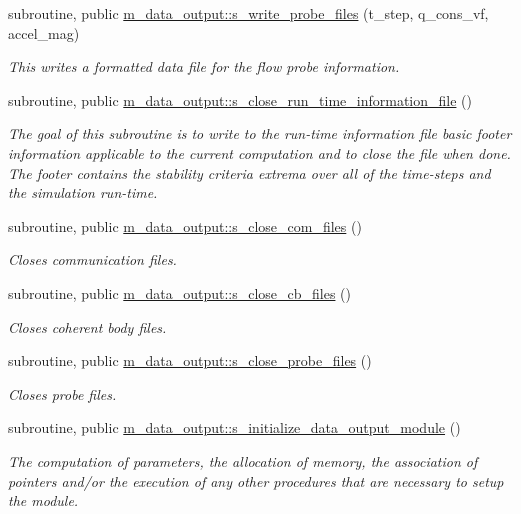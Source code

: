 \begin{DoxyCompactItemize}
subroutine, public \hyperlink{namespacem__data__output_a29f34883bc8e9d895dbb4232493397a1}{m\+\_\+data\+\_\+output\+::s\+\_\+write\+\_\+probe\+\_\+files} (t\+\_\+step, q\+\_\+cons\+\_\+vf, accel\+\_\+mag)
\begin{DoxyCompactList}\small\item\em This writes a formatted data file for the flow probe information. \end{DoxyCompactList}\item 
subroutine, public \hyperlink{namespacem__data__output_a390239a7390ec5d07e31298573bf09bf}{m\+\_\+data\+\_\+output\+::s\+\_\+close\+\_\+run\+\_\+time\+\_\+information\+\_\+file} ()
\begin{DoxyCompactList}\small\item\em The goal of this subroutine is to write to the run-\/time information file basic footer information applicable to the current computation and to close the file when done. The footer contains the stability criteria extrema over all of the time-\/steps and the simulation run-\/time. \end{DoxyCompactList}\item 
subroutine, public \hyperlink{namespacem__data__output_a5646b1076ff72b2260ebefa3f44d4754}{m\+\_\+data\+\_\+output\+::s\+\_\+close\+\_\+com\+\_\+files} ()
\begin{DoxyCompactList}\small\item\em Closes communication files. \end{DoxyCompactList}\item 
subroutine, public \hyperlink{namespacem__data__output_aa0eb8be31f69888d750e18df197c6011}{m\+\_\+data\+\_\+output\+::s\+\_\+close\+\_\+cb\+\_\+files} ()
\begin{DoxyCompactList}\small\item\em Closes coherent body files. \end{DoxyCompactList}\item 
subroutine, public \hyperlink{namespacem__data__output_a4036cc239adda35d59422a3e61bb657e}{m\+\_\+data\+\_\+output\+::s\+\_\+close\+\_\+probe\+\_\+files} ()
\begin{DoxyCompactList}\small\item\em Closes probe files. \end{DoxyCompactList}\item 
subroutine, public \hyperlink{namespacem__data__output_ab65b312ef83adb104cafafada9c998b6}{m\+\_\+data\+\_\+output\+::s\+\_\+initialize\+\_\+data\+\_\+output\+\_\+module} ()
\begin{DoxyCompactList}\small\item\em The computation of parameters, the allocation of memory, the association of pointers and/or the execution of any other procedures that are necessary to setup the module. \end{DoxyCompactList}\item 

\end{DoxyCompactItemize}
